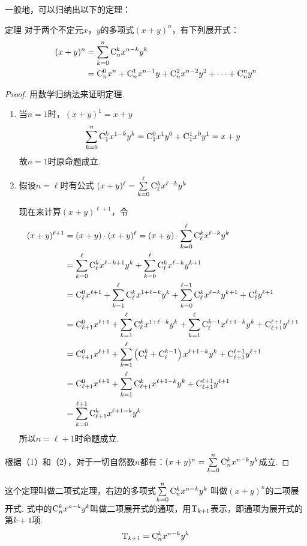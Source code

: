 一般地，可以归纳出以下的定理：
\begin{blk}
    {定理} 对于两个不定元$x$，$y$的多项式$(x+y)^n$，有下列展开式：
\[\begin{split}
    (x+y)^n&=\sum^n_{k=0}{\rm C}^{k}_{n}x^{n-k}y^k\\
    &={\rm C}^{0}_{n}x^n+{\rm C}^{1}_{n}x^{n-1}y+{\rm C}^{2}_{n}x^{n-2}y^2+\cdots+{\rm C}^{n}_{n}y^n
\end{split}\]
\end{blk}

\begin{proof}
    用数学归纳法来证明定理.
\begin{enumerate}[(1)]
    \item 当$n=1$时，$(x+y)^1=x+y$
\[\sum^n_{k=0}{\rm C}^{k}_{1}x^{1-k}y^k={\rm C}^{0}_{1}x^1y^0+{\rm C}^{1}_{1}x^{0}y^1=x+y\]
故$n=1$时原命题成立.
\item 假设$n=\ell$时有公式 $(x+y)^{\ell}=\sum\limits^\ell_{k=0}{\rm C}^{k}_{\ell}x^{\ell-k}y^k$

现在来计算$(x+y)^{\ell+1}$，令
\[\begin{split}
    (x+y)^{\ell+1}&=(x+y)\cdot (x+y)^{\ell}=(x+y)\cdot \sum^\ell_{k=0}{\rm C}^{k}_{\ell}x^{\ell-k}y^k\\
&=\sum^\ell_{k=0}{\rm C}^{k}_{\ell}x^{\ell-k+1}y^k +\sum^\ell_{k=0}{\rm C}^{k}_{\ell}x^{\ell-k}y^{k+1}\\
&={\rm C}^{0}_{\ell}x^{\ell+1}+\sum^\ell_{k=1}{\rm C}^{k}_{\ell}x^{1+\ell-k}y^k+\sum^{\ell-1}_{k=0}{\rm C}^{k}_{\ell}x^{\ell-k}y^{k+1}+{\rm C}^{\ell}_{\ell}y^{\ell+1}\\
&={\rm C}^{0}_{\ell+1}x^{\ell+1}+\sum^\ell_{k=1}{\rm C}^{k}_{\ell}x^{1+\ell-k}y^k+\sum^{\ell}_{k=1}{\rm C}^{k-1}_{\ell}x^{\ell+1-k}y^{k}+{\rm C}^{\ell+1}_{\ell+1}y^{\ell+1}\\
&={\rm C}^{0}_{\ell+1}x^{\ell+1}+\sum^\ell_{k=1}\left({\rm C}^{k}_{\ell}+{\rm C}^{k-1}_{\ell}\right)x^{\ell+1-k}y^k+{\rm C}^{\ell+1}_{\ell+1}y^{\ell+1}\\
&={\rm C}^{0}_{\ell+1}x^{\ell+1}+\sum^\ell_{k=1}{\rm C}^{k}_{\ell+1}x^{\ell+1-k}y^k +{\rm C}^{\ell+1}_{\ell+1}y^{\ell+1}\\
&=\sum^{\ell+1}_{k=0}{\rm C}^{k}_{\ell+1}x^{\ell+1-k}y^k 
\end{split} \]
所以$n=\ell+1$时命题成立.
\end{enumerate}
根据（1）和（2），对于一切自然数$n$都有：$(x+y)^n=\sum\limits^n_{k=0}{\rm C}^{k}_{n}x^{n-k}y^k$成立.
\end{proof}

这个定理叫做二项式定理，右边的多项式$\sum\limits^n_{k=0}{\rm C}^{k}_{n}x^{n-k}y^k$
叫做$(x+y)^n$的二项展开式. 式中的${\rm C}^{k}_{n}x^{n-k}y^k$叫做二项展开式的通项，用${\rm T}_{k+1}$表示，即通项为展开式的第$k+1$项.
\[{\rm T}_{k+1}={\rm C}^{k}_{n}x^{n-k}y^k\]

